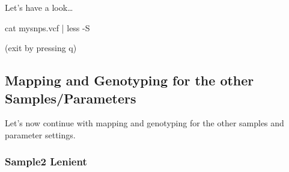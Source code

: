 \documentclass[
  letterpaper,
]{book}
\newenvironment{Shaded}{}{}
\newcommand{\AttributeTok}[1]{\textcolor[rgb]{0.84,0.23,0.29}{#1}}
\newcommand{\FunctionTok}[1]{\textcolor[rgb]{0.44,0.26,0.76}{#1}}
\newcommand{\KeywordTok}[1]{\textcolor[rgb]{0.84,0.23,0.29}{#1}}
\newcommand{\NormalTok}[1]{\textcolor[rgb]{0.14,0.16,0.18}{#1}}
\begin{document}
Let's have a look\ldots{}

\begin{Shaded}
\begin{Highlighting}[]
\FunctionTok{cat}\NormalTok{ mysnps.vcf }\KeywordTok{|} \FunctionTok{less} \AttributeTok{{-}S}
\end{Highlighting}
\end{Shaded}

(exit by pressing q)

\hypertarget{mapping-and-genotyping-for-the-other-samplesparameters}{%
\subsection{Mapping and Genotyping for the other
Samples/Parameters}\label{mapping-and-genotyping-for-the-other-samplesparameters}}

Let's now continue with mapping and genotyping for the other samples and
parameter settings.

\hypertarget{sample2-lenient}{%
\subsubsection{Sample2 Lenient}\label{sample2-lenient}}
\end{document}
